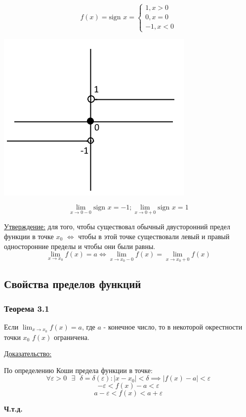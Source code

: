 \documentclass[12pt]{article}
\begin{document}
    \begin{adjustwidth}{1.5em}{1.5em}
        \[f(x) = \text{sign } x = \begin{cases}
            1, x > 0\\
            0, x = 0\\
            -1, x < 0
        \end{cases}
        \]
        \begin{center}
            \includegraphics{3.2.3}
        \end{center}
        \[
            \lim_{x\to 0-0} \text{sign } x = -1; \lim_{x\to 0+0} \text{sign } x = 1
        \]
    \end{adjustwidth}
    \underline{Утверждение:} для того, чтобы существовал обычный двусторонний предел функции в точке $x_0$ $\Leftrightarrow$ чтобы в этой точке существовали левый и правый односторонние пределы и чтобы они были равны.
    \[ \lim_{x \to x_0} f(x) = a \Leftrightarrow \lim_{x \to x_0 - 0}f(x) = \lim_{x \to x_0 + 0} f(x) \]

    \subsection{Свойства пределов функций}
    \subsubsection*{Теорема 3.1}
    Если $\lim_{x\to x_0}f(x) = a$, где $a$ - конечное число, то в некоторой окрестности точки $x_0$ $f(x)$ ограничена.\par\noindent
    \underline{Доказательство:}
    \begin{adjustwidth}{1.5em}{1.5em}
        По определению Коши предела функции в точке:
        \[ \forall \varepsilon > 0 \text{ } \exists \text{ } \delta = \delta(\varepsilon) : |x - x_0| < \delta \implies |f(x) - a| < \varepsilon \]
        \[ -\varepsilon < f(x) - a < \varepsilon \]
        \[ a - \varepsilon < f(x) < a + \varepsilon \]
        \begin{center}
            \textbf{Ч.т.д.}
        \end{center}
    \end{adjustwidth}
\end{document}
